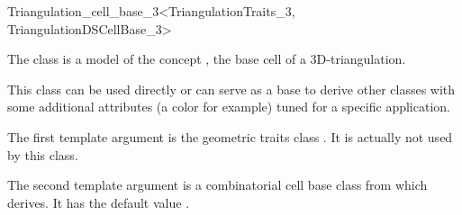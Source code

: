 

\begin{ccRefClass}{Triangulation_cell_base_3<TriangulationTraits_3, TriangulationDSCellBase_3>}

\ccDefinition

The class  is a model of the concept
, the base cell of a 3D-triangulation.

This class can be used directly or can serve as a base to derive other classes
with some additional attributes (a color for example) tuned for a specific
application.


\ccParameters

The first template argument is the geometric traits class
.  It is actually not used by this class.

The second template argument is a combinatorial cell base class from which
 derives.
It has the default value .

\ccIsModel {}

\ccInheritsFrom {}

\ccSeeAlso

\\
\\

\end{ccRefClass}
